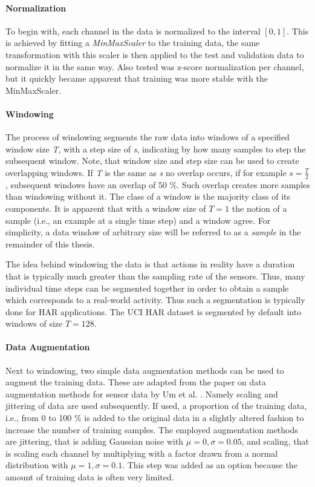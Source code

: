 \documentclass[11pt,titlepage,oneside,openany]{book}
\begin{document}
\paragraph{Normalization}
To begin with, each channel in the data is normalized to the interval $[0,1]$. This is achieved by fitting a \emph{MinMaxScaler} to the training data, the same transformation with this scaler is then applied to the test and validation data to normalize it in the same way. Also tested was z-score normalization per channel, but it quickly became apparent that training was more stable with the MinMaxScaler.

\paragraph{Windowing}
The process of windowing segments the raw data into windows of a specified window size \emph{T}, with a step size of \emph{s}, indicating by how many samples to step the subsequent window. Note, that window size and step size can be used to create overlapping windows. If \emph{T} is the same as \emph{s} no overlap occurs, if for example $s = \frac{T}{2}$, subsequent windows have an overlap of 50 \%. Such overlap creates more samples than windowing without it. The class of a window is the majority class of its components. It is apparent that with a window size of $T=1$ the notion of a sample (i.e., an example at a single time step) and a window agree. For simplicity, a data window of arbitrary size will be referred to as a \emph{sample} in the remainder of this thesis.

The idea behind windowing the data is that actions in reality have a duration that is typically much greater than the sampling rate of the sensors. Thus, many individual time steps can be segmented together in order to obtain a sample which corresponds to a real-world activity. Thus such a segmentation is typically done for HAR applications. The UCI HAR dataset is segmented by default into windows of size $T=128$.

\paragraph{Data Augmentation}
Next to windowing, two simple data augmentation methods can be used to augment the training data. These are adapted from the paper on data augmentation methods for sensor data by Um et al. \cite{um_data_2017}. Namely scaling and jittering of data are used subsequently. If used, a proportion of the training data, i.e., from 0 to 100 \% is added to the original data in a slightly altered fashion to increase the number of training samples. The employed augmentation methods are jittering, that is adding Gaussian noise with $\mu = 0, \sigma = 0.05$, and scaling, that is scaling each channel by multiplying with a factor drawn from a normal distribution with $\mu = 1, \sigma = 0.1$. This step was added as an option because the amount of training data is often very limited.
\end{document}

